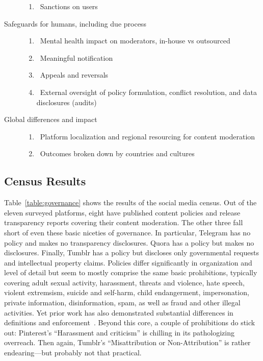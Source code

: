 \begin{description}
\begin{enumerate}[resume]
        \item {}~Sanctions on users \label{itm:accounts}
    \end{enumerate}
\item[Safeguards for humans, including due process]\hfill
    \begin{enumerate}[resume]
        \item {}~Mental health impact on moderators,
            in-house vs outsourced \label{itm:mental-health}
        \item {}~Meaningful notification \label{itm:notification}
        \item {}~Appeals and reversals \label{itm:appeals}
        \item {}~External oversight of policy formulation, conflict
            resolution, and data disclosures (audits) \label{itm:oversight}
    \end{enumerate}
\item[Global differences and impact]\hfill
    \begin{enumerate}[resume]
        \item {}~Platform localization and regional
            resourcing for content moderation \label{itm:resourcing}
        \item {}~Outcomes broken down by countries and
            cultures \label{itm:countries}
    \end{enumerate}
\end{description}


\subsection{Census Results}
\label{sec:census-results}

Table~\ref{table:governance} shows the results of the social media census. Out
of the eleven surveyed platforms, eight have published content policies and
release transparency reports covering their content moderation. The other three
fall short of even these basic niceties of governance. In particular, Telegram
has no policy and makes no transparency disclosures. Quora has a policy but
makes no disclosures. Finally, Tumblr has a policy but discloses only
governmental requests and intellectual property claims. Policies differ
significantly in organization and level of detail but seem to mostly comprise
the same basic prohibitions, typically covering adult sexual activity,
harassment, threats and violence, hate speech, violent extremsism, suicide and
self-harm, child endangerment, impersonation, private information,
disinformation, spam, as well as fraud and other illegal activities. Yet prior
work has also demonstrated substantial differences in definitions and
enforcement~\cite{FieslerJiangea2018,PaterKimea2016}. Beyond this core, a couple
of prohibitions do stick out: Pinterest's ``Harassment and criticism'' is
chilling in its pathologizing overreach. Then again, Tumblr's ``Misattribution
or Non-Attribution'' is rather endearing---but probably not that practical.

